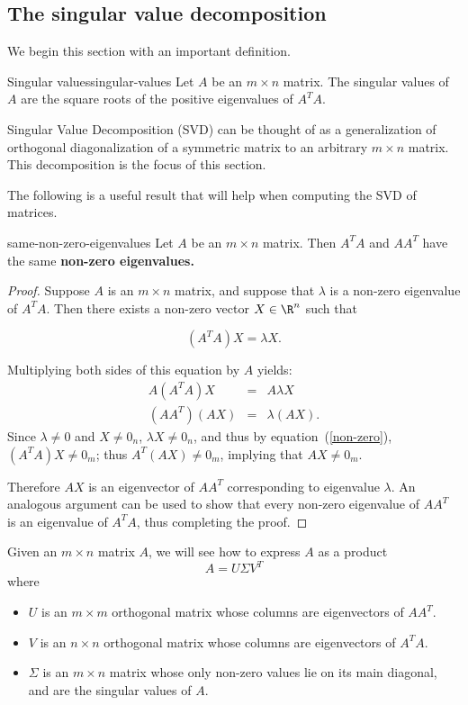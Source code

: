 \subsection{The singular value decomposition}

We begin this section with an important definition.

\begin{definition}{Singular values}{singular-values}
Let $A$ be an $m\times n$ matrix. The singular values of $A$ are the square roots of the positive
eigenvalues of $A^TA$.
\end{definition}

Singular Value Decomposition (SVD) can be thought of as 
a generalization of orthogonal diagonalization of a symmetric matrix
to an arbitrary $m\times n$ matrix. This decomposition is the focus of this section. 

The following is a useful result that will help when computing the SVD of matrices.

\begin{proposition}{}{same-non-zero-eigenvalues}
Let $A$ be an $m \times n$ matrix. Then $A^TA$ and $AA^T$ have the same \bf{non-zero} eigenvalues.
\end{proposition}

\begin{proof}
Suppose $A$ is an $m\times n$ matrix, and suppose that  $\lambda$ is a non-zero eigenvalue of $A^TA$.
Then there exists a non-zero vector $X\in \R^n$ such that

\begin{equation}\label{non-zero}
(A^TA)X=\lambda X.
\end{equation}

Multiplying both sides of this equation by $A$ yields:
\begin{eqnarray*}
A(A^TA)X & = & A\lambda X\\
(AA^T)(AX) & = & \lambda (AX).
\end{eqnarray*}
Since $\lambda\neq 0$ and $X\neq 0_n$, $\lambda X\neq 0_n$,
and thus by equation~(\ref{non-zero}),
$(A^TA)X\neq 0_m$; thus $A^T(AX)\neq 0_m$, 
implying that $AX\neq 0_m$.

Therefore $AX$ is an eigenvector of $AA^T$ corresponding to eigenvalue
$\lambda$.  An analogous argument can be used to show that every
non-zero eigenvalue of $AA^T$ is an eigenvalue of $A^TA$, thus
completing the proof.
\end{proof}

Given an $m\times n$ matrix $A$, we will see how to express $A$ as a product
\[ A=U\Sigma V^T\]
where
\begin{itemize}
\item $U$ is an $m\times m$ orthogonal matrix whose columns are
eigenvectors of $AA^T$.
\item $V$ is an $n\times n$ orthogonal matrix whose columns are
eigenvectors of $A^TA$.
\item $\Sigma$ is an $m\times n$ matrix whose only non-zero values
lie on its main diagonal, and are the singular values of $A$.
\end{itemize}


